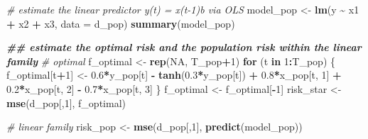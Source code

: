 \documentclass[
]{book}
\newenvironment{Shaded}{\begin{snugshade}}{\end{snugshade}}
\newcommand{\AttributeTok}[1]{\textcolor[rgb]{0.13,0.29,0.53}{#1}}
\newcommand{\CommentTok}[1]{\textcolor[rgb]{0.56,0.35,0.01}{\textit{#1}}}
\newcommand{\ConstantTok}[1]{\textcolor[rgb]{0.56,0.35,0.01}{#1}}
\newcommand{\ControlFlowTok}[1]{\textcolor[rgb]{0.13,0.29,0.53}{\textbf{#1}}}
\newcommand{\DecValTok}[1]{\textcolor[rgb]{0.00,0.00,0.81}{#1}}
\newcommand{\DocumentationTok}[1]{\textcolor[rgb]{0.56,0.35,0.01}{\textbf{\textit{#1}}}}
\newcommand{\FloatTok}[1]{\textcolor[rgb]{0.00,0.00,0.81}{#1}}
\newcommand{\FunctionTok}[1]{\textcolor[rgb]{0.13,0.29,0.53}{\textbf{#1}}}
\newcommand{\NormalTok}[1]{#1}
\newcommand{\OtherTok}[1]{\textcolor[rgb]{0.56,0.35,0.01}{#1}}
\newcommand{\SpecialCharTok}[1]{\textcolor[rgb]{0.81,0.36,0.00}{\textbf{#1}}}
\begin{document}
\begin{Shaded}
\begin{Highlighting}[]
\CommentTok{\# estimate the linear predictor y(t) = x(t{-}1)\textquotesingle{}b via OLS}
\NormalTok{model\_pop }\OtherTok{\textless{}{-}} \FunctionTok{lm}\NormalTok{(y }\SpecialCharTok{\textasciitilde{}}\NormalTok{ x1 }\SpecialCharTok{+}\NormalTok{ x2 }\SpecialCharTok{+}\NormalTok{ x3, }\AttributeTok{data =}\NormalTok{ d\_pop)}
\FunctionTok{summary}\NormalTok{(model\_pop)}
\end{Highlighting}
\end{Shaded}

\begin{Shaded}
\begin{Highlighting}[]
\DocumentationTok{\#\# estimate the optimal risk and the population risk within the linear family}
\CommentTok{\# optimal}
\NormalTok{f\_optimal }\OtherTok{\textless{}{-}} \FunctionTok{rep}\NormalTok{(}\ConstantTok{NA}\NormalTok{, T\_pop}\SpecialCharTok{+}\DecValTok{1}\NormalTok{)}
\ControlFlowTok{for}\NormalTok{ (t }\ControlFlowTok{in} \DecValTok{1}\SpecialCharTok{:}\NormalTok{T\_pop) \{}
\NormalTok{  f\_optimal[t}\SpecialCharTok{+}\DecValTok{1}\NormalTok{] }\OtherTok{\textless{}{-}} \FloatTok{0.6}\SpecialCharTok{*}\NormalTok{y\_pop[t] }\SpecialCharTok{{-}} \FunctionTok{tanh}\NormalTok{(}\FloatTok{0.3}\SpecialCharTok{*}\NormalTok{y\_pop[t]) }\SpecialCharTok{+} 
                    \FloatTok{0.8}\SpecialCharTok{*}\NormalTok{x\_pop[t, }\DecValTok{1}\NormalTok{] }\SpecialCharTok{+} \FloatTok{0.2}\SpecialCharTok{*}\NormalTok{x\_pop[t, }\DecValTok{2}\NormalTok{] }\SpecialCharTok{{-}}
                    \FloatTok{0.7}\SpecialCharTok{*}\NormalTok{x\_pop[t, }\DecValTok{3}\NormalTok{] }
\NormalTok{\}}
\NormalTok{f\_optimal }\OtherTok{\textless{}{-}}\NormalTok{ f\_optimal[}\SpecialCharTok{{-}}\DecValTok{1}\NormalTok{]}
\NormalTok{risk\_star }\OtherTok{\textless{}{-}} \FunctionTok{mse}\NormalTok{(d\_pop[,}\DecValTok{1}\NormalTok{], f\_optimal)}

\CommentTok{\# linear family}
\NormalTok{risk\_pop  }\OtherTok{\textless{}{-}} \FunctionTok{mse}\NormalTok{(d\_pop[,}\DecValTok{1}\NormalTok{], }\FunctionTok{predict}\NormalTok{(model\_pop))}
\end{Highlighting}
\end{Shaded}
\end{document}
